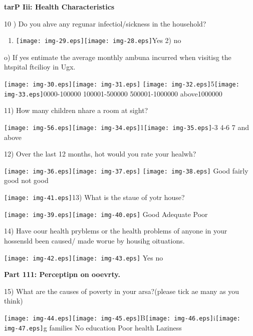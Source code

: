 \documentclass[12pt]{article}
\begin{document}
\textbf{tarP Iii: Health Characteristics }

10 ) Do you ahve any regunar infectiol/sickness in the household?

\begin{enumerate}
	\item \texttt{[image: img-29.eps]}\texttt{[image: img-28.eps]}Yes
          2) no
\end{enumerate}

o) If yes entimate the average monthly ambuna incurred when visitisg the
htspital ftcilioy in Ugx.

\texttt{[image: img-30.eps]}\texttt{[image: img-31.eps]}
\texttt{[image: img-32.eps]}5\texttt{[image: img-33.eps]}0000-100000
        100001-500000        500001-1000000        above1000000

11) How many children nhare a room at sight?

\texttt{[image: img-56.eps]}\texttt{[image: img-34.eps]}1\texttt{[image: img-35.eps]}-3
              4-6           7 and above

12) Over the last 12 months, hot would you rate your healwh?

\texttt{[image: img-36.eps]}\texttt{[image: img-37.eps]}
\texttt{[image: img-38.eps]}    Good             fairly good         
          not good

\texttt{[image: img-41.eps]}13) What is the staue of yotr house?

\texttt{[image: img-39.eps]}\texttt{[image: img-40.eps]}
         Good           Adequate                Poor

14) Have oour health pryblems or the health problems of anyone in your hossensld
been caused/ made worue by housihg oituations.

\texttt{[image: img-42.eps]}\texttt{[image: img-43.eps]}
        Yes              no

\textbf{Part 111: Perceptipn on ooevrty.     }

15) What are the causes of poverty in your arsa?(please tick ae many as you
think)

\texttt{[image: img-44.eps]}\texttt{[image: img-45.eps]}B\texttt{[image: img-46.eps]}i\texttt{[image: img-47.eps]}g
families       No education          Poor health            Laziness
\end{document}
